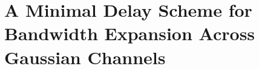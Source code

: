 \chapter[Bandwidth Expansion for Gaussian Channels]%
{A Minimal Delay Scheme for Bandwidth Expansion Across Gaussian
Channels}
